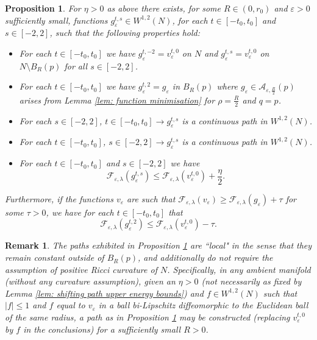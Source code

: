 \documentclass[11pt]{article}
\newtheorem{prop}{Proposition}
\newtheorem{rem}{Remark}
\begin{document}
\begin{prop}\label{prop: local path}
For $\eta > 0$ as above there exists, for some $R \in (0,r_0)$ and $\varepsilon > 0$ sufficiently small, functions $g^{t,s}_\varepsilon \in W^{1,2}(N)$, for each $t \in [-t_0,t_0]$ and $s \in [-2,2]$, such that the following properties hold:
\begin{itemize}
    \item For each $t \in [-t_0,t_0]$ we have $g^{t,-2}_\varepsilon = v^{t,0}_\varepsilon$ on $N$ and $g^{t,s}_\varepsilon = v^{t,0}_\varepsilon$ on $N \setminus B_R(p)$ for all $s \in [-2,2]$.
    
    \item For each $t \in [-t_0,t_0]$ we have $g^{t,2}_\varepsilon = g_\varepsilon$ in $B_R(p)$ where $g_\varepsilon \in \mathcal{A}_{\varepsilon,\frac{R}{2}}(p)$ arises from Lemma \ref{lem: function minimisation} for $\rho = \frac{R}{2}$ and $q = p$.
 
    \item For each $s \in [-2,2]$, $t \in [-t_0,t_0] \rightarrow g^{t,s}_\varepsilon$ is a continuous path in $W^{1,2}(N)$.

    \item For each $t \in [-t_0,t_0]$, $s \in [-2,2] \rightarrow g^{t,s}_\varepsilon$ is a continuous path in $W^{1,2}(N)$.
    
    \item For each $t \in [-t_0,t_0]$ and $s \in [-2,2]$ we have 
    \begin{equation*}
        \mathcal{F}_{\varepsilon,\lambda}(g^{t,s}_\varepsilon) \leq \mathcal{F}_{\varepsilon,\lambda}(v^{t,0}_\varepsilon) + \frac{\eta}{2}.
    \end{equation*}
\end{itemize}
Furthermore, if the functions $v_\varepsilon$ are such that $\mathcal{F}_{\varepsilon,\lambda}(v_\varepsilon) \geq \mathcal{F}_{\varepsilon,\lambda}(g_\varepsilon) + \tau$ for some $\tau > 0$, we have for each $t \in [-t_0,t_0]$ that 
\begin{equation*}
    \mathcal{F}_{\varepsilon,\lambda}(g^{t,2}_\varepsilon) \leq \mathcal{F}_{\varepsilon,\lambda}(v^{t,0}_\varepsilon) - \tau.
\end{equation*}
\end{prop}

\begin{rem}
The paths exhibited in Proposition \ref{prop: local path} are “local" in the sense that they remain constant outside of $B_R(p)$, and additionally do not require the assumption of positive Ricci curvature of $N$. Specifically, in any ambient manifold (without any curvature assumption), given an $\eta > 0$ (not necessarily as fixed by Lemma \ref{lem: shifting path upper energy bounds}) and $f \in W^{1,2}(N)$ such that $|f| \leq 1$ and $f$ equal to $v_\varepsilon$ in a ball bi-Lipschitz diffeomorphic to the Euclidean ball of the same radius, a path as in Proposition \ref{prop: local path} may be constructed (replacing $v^{t,0}_\varepsilon$ by $f$ in the conclusions) for a sufficiently small $R > 0$.
\end{rem}
\end{document}
